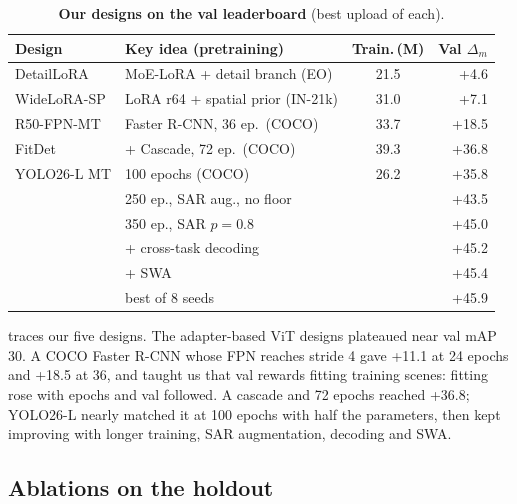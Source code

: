 \begin{table}[t]
  \centering
  \footnotesize
  \setlength{\tabcolsep}{2.6pt}
  \begin{tabular}{@{}llcr@{}}
    \toprule
    Design & Key idea (pretraining) & Train.\,(M) & Val $\Delta_m$ \\
    \midrule
    DetailLoRA  & MoE-LoRA + detail branch (EO)     & 21.5 & +4.6 \\
    WideLoRA-SP & LoRA r64 + spatial prior (IN-21k) & 31.0 & +7.1 \\
    R50-FPN-MT  & Faster R-CNN, 36 ep.\ (COCO)      & 33.7 & +18.5 \\
    FitDet      & + Cascade, 72 ep.\ (COCO)          & 39.3 & +36.8 \\
    \midrule
    YOLO26-L MT & 100 epochs (COCO)                        & 26.2 & +35.8 \\
                & 250 ep., SAR aug., no floor      &      & +43.5 \\
                & 350 ep., SAR $p{=}0.8$                   &      & +45.0 \\
                & + cross-task decoding                    &      & +45.2 \\
                & + SWA                                    &      & +45.4 \\
                & best of 8 seeds                          &      & +45.9 \\
    \bottomrule
  \end{tabular}
  \caption{\textbf{Our designs on the val leaderboard} (best upload of each).}
  \label{tab:journey}
\end{table}

 traces our five designs.
The adapter-based ViT designs plateaued near val mAP 30.
A COCO Faster R-CNN whose FPN reaches stride 4 gave +11.1 at 24 epochs and +18.5 at 36, and taught us that val rewards
fitting training scenes: fitting rose with epochs and val followed.
A cascade and 72 epochs reached +36.8; YOLO26-L nearly matched it at 100 epochs with half the parameters, then kept
improving with longer training, SAR augmentation, decoding and SWA.

\subsection{Ablations on the holdout}
\label{sec:ablation}

